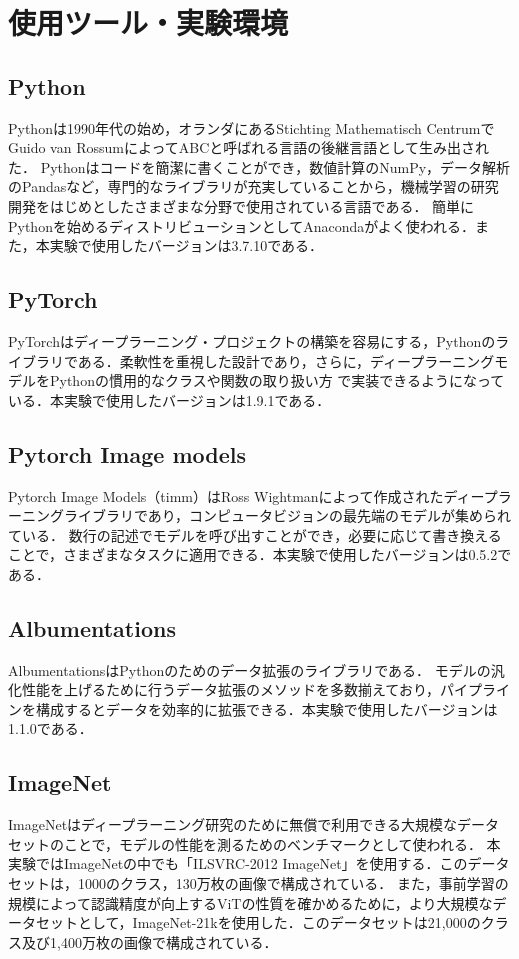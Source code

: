 \documentclass[a4paper, oneside, openany, dvipdfmx]{suribt}%
\begin{document}
\section{使用ツール・実験環境}
\subsection{Python}
Pythonは1990年代の始め，オランダにあるStichting Mathematisch CentrumでGuido van RossumによってABCと呼ばれる言語の後継言語として生み出された．
Pythonはコードを簡潔に書くことができ，数値計算のNumPy，データ解析のPandasなど，専門的なライブラリが充実していることから，機械学習の研究開発をはじめとしたさまざまな分野で使用されている言語である．
簡単にPythonを始めるディストリビューションとしてAnacondaがよく使われる．また，本実験で使用したバージョンは3.7.10である．
\subsection{PyTorch}
PyTorchはディープラーニング・プロジェクトの構築を容易にする，Pythonのライブラリである．柔軟性を重視した設計であり，さらに，ディープラーニングモデルをPythonの慣用的なクラスや関数の取り扱い方
で実装できるようになっている．本実験で使用したバージョンは1.9.1である．
\subsection{Pytorch Image models}
Pytorch Image Models（timm）はRoss Wightmanによって作成されたディープラーニングライブラリであり，コンピュータビジョンの最先端のモデルが集められている．
数行の記述でモデルを呼び出すことができ，必要に応じて書き換えることで，さまざまなタスクに適用できる．本実験で使用したバージョンは0.5.2である．
\subsection{Albumentations}
AlbumentationsはPythonのためのデータ拡張のライブラリである．
モデルの汎化性能を上げるために行うデータ拡張のメソッドを多数揃えており，パイプラインを構成するとデータを効率的に拡張できる．本実験で使用したバージョンは1.1.0である．
\subsection{ImageNet}
ImageNetはディープラーニング研究のために無償で利用できる大規模なデータセットのことで，モデルの性能を測るためのベンチマークとして使われる．
本実験ではImageNetの中でも「ILSVRC-2012 ImageNet」を使用する．このデータセットは，1000のクラス，130万枚の画像で構成されている．
また，事前学習の規模によって認識精度が向上するViTの性質を確かめるために，より大規模なデータセットとして，ImageNet-21kを使用した．このデータセットは21,000のクラス及び1,400万枚の画像で構成されている．
\end{document}
